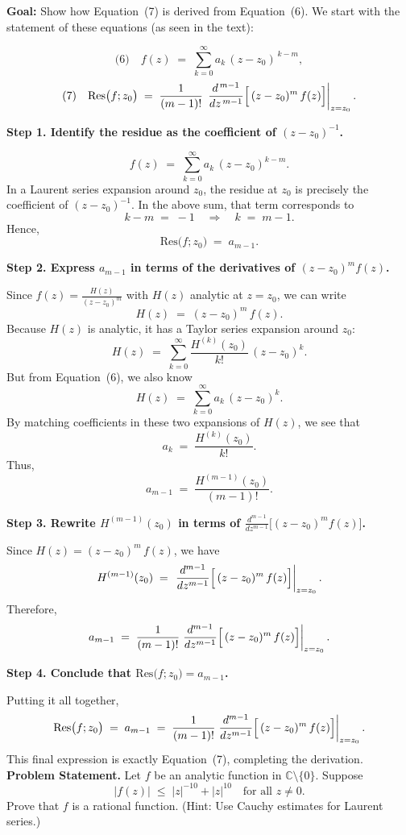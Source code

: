 \documentclass[12pt]{article}
\theoremstyle{definition} %
\theoremstyle{plain} %
\begin{document}
\noindent
\textbf{Goal:} Show how Equation~(7) is derived from Equation~(6). We start with the statement of these equations (as seen in the text):

\[
\text{(6)} \quad f(z) \;=\; \sum_{k=0}^{\infty} a_k\,(z - z_0)^{\,k - m},
\]
\[
\text{(7)} \quad \mathrm{Res}\bigl(f;z_0\bigr)
\;=\;
\frac{1}{(m-1)!}\,\left.\frac{d^{\,m-1}}{dz^{\,m-1}}
\Bigl[\,(z - z_0)^m\,f(z)\Bigr]\right|_{z=z_0}.
\]

\bigskip
\noindent
\textbf{Step 1. Identify the residue as the coefficient of \((z - z_0)^{-1}\).}

\[
f(z) \;=\; \sum_{k=0}^{\infty} a_k\,(z - z_0)^{k - m}.
\]
In a Laurent series expansion around \(z_0\), the residue at \(z_0\) is precisely the coefficient of \((z - z_0)^{-1}\). In the above sum, that term corresponds to
\[
k - m \;=\; -1
\quad\Longrightarrow\quad
k \;=\; m-1.
\]
Hence,
\[
\mathrm{Res}\bigl(f;z_0\bigr)
\;=\;
a_{m-1}.
\]

\bigskip
\noindent
\textbf{Step 2. Express \(a_{m-1}\) in terms of the derivatives of \((z - z_0)^m f(z)\).}

Since \(f(z) = \frac{H(z)}{(z - z_0)^m}\) with \(H(z)\) analytic at \(z=z_0\), we can write
\[
H(z) \;=\; (z - z_0)^m\,f(z).
\]
Because \(H(z)\) is analytic, it has a Taylor series expansion around \(z_0\):
\[
H(z)
\;=\;
\sum_{k=0}^{\infty} \frac{H^{(k)}(z_0)}{k!}\,(z - z_0)^k.
\]
But from Equation~(6), we also know
\[
H(z)
\;=\;
\sum_{k=0}^{\infty} a_k\,(z - z_0)^k.
\]
By matching coefficients in these two expansions of \(H(z)\), we see that
\[
a_k
\;=\;
\frac{H^{(k)}(z_0)}{k!}.
\]
Thus,
\[
a_{m-1}
\;=\;
\frac{H^{(m-1)}(z_0)}{(m-1)!}.
\]

\bigskip
\noindent
\textbf{Step 3. Rewrite \(H^{(m-1)}(z_0)\) in terms of \(\frac{d^{m-1}}{dz^{m-1}}\bigl[(z - z_0)^m f(z)\bigr]\).}

Since \(H(z) = (z - z_0)^m\,f(z)\), we have
\[
H^{(m-1)}(z_0)
\;=\;
\left.
\frac{d^{m-1}}{dz^{m-1}}
\Bigl[\,(z - z_0)^m\,f(z)\Bigr]
\right|_{z = z_0}.
\]
Therefore,
\[
a_{m-1}
\;=\;
\frac{1}{(m-1)!}
\left.
\frac{d^{m-1}}{dz^{m-1}}
\Bigl[\,(z - z_0)^m\,f(z)\Bigr]
\right|_{z = z_0}.
\]

\bigskip
\noindent
\textbf{Step 4. Conclude that \(\mathrm{Res}\bigl(f;z_0\bigr) = a_{m-1}\).}

Putting it all together,
\[
\mathrm{Res}\bigl(f;z_0\bigr)
\;=\;
a_{m-1}
\;=\;
\frac{1}{(m-1)!}
\left.
\frac{d^{m-1}}{dz^{m-1}}
\Bigl[\,(z - z_0)^m\,f(z)\Bigr]
\right|_{z = z_0}.
\]
This final expression is exactly Equation~(7), completing the derivation.
\noindent
\textbf{Problem Statement.}
Let $f$ be an analytic function in $\mathbb{C}\setminus\{0\}$. Suppose
\[
|f(z)| \;\le\; |z|^{-10} + |z|^{10}
\quad\text{for all }z \neq 0.
\]
Prove that $f$ is a rational function. (Hint: Use Cauchy estimates for Laurent series.)
\end{document}
